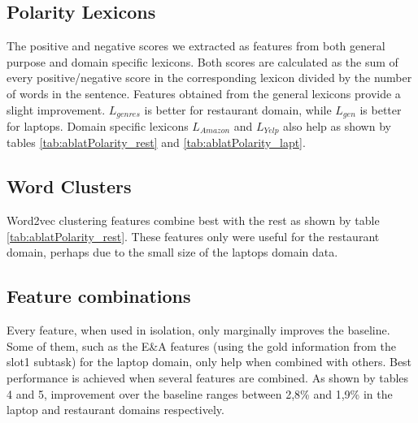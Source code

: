 \documentclass[11pt,letterpaper]{article}
\begin{document}
\subsection{Polarity Lexicons}
\label{sec:slot3_lexicons}

The positive and negative scores we extracted as features from both general purpose and domain specific lexicons. Both scores are calculated as the sum of every positive/negative score in the corresponding lexicon divided by the number of words in the sentence. Features obtained from the general lexicons provide a slight improvement. $L_{genres}$ is better for restaurant domain, while $L_{gen}$ is better for laptops. Domain specific lexicons $L_{Amazon}$ and $L_{Yelp}$ also help as shown by tables \ref{tab:ablatPolarity_rest} and  \ref{tab:ablatPolarity_lapt}.

\subsection{Word Clusters}
\label{sec:slot3_clusters}

Word2vec clustering features combine best with the rest as shown by table \ref{tab:ablatPolarity_rest}. These features only were useful for the restaurant domain, perhaps due to the small size of the laptops domain data.

\subsection{Feature combinations}
\label{sec:slot3_comb}

Every feature, when used in isolation, only marginally improves the baseline. Some of them, such as the E\&A features (using the gold information from the slot1 subtask) for the laptop domain, only help when combined with others. Best performance is achieved when several features are combined. As shown by tables 4 and 5, improvement over the baseline ranges between 2,8\% and 1,9\%  in the laptop and restaurant domains respectively.
\end{document}
